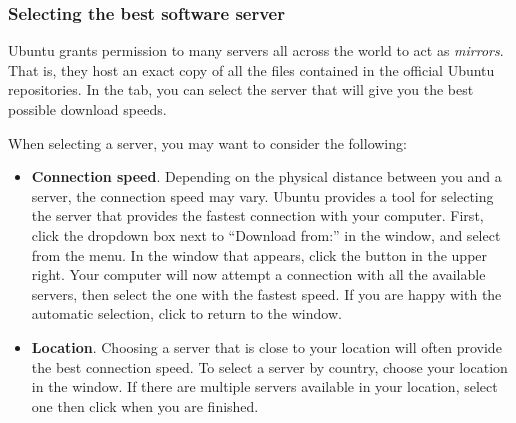 \subsubsection{Selecting the best software server}

Ubuntu grants permission to many servers all across the world to act as \emph{mirrors}. That is, they host an exact copy of all the files contained in the official Ubuntu repositories. In the  tab, you can select the server that will give you the best possible download speeds. 

When selecting a server, you may want to consider the following:

\begin{itemize}
	\item \textbf{Connection speed}. Depending on the physical distance between you and a server, the connection speed may vary. Ubuntu provides a tool for selecting the server that provides the fastest connection with your computer. 
		\subitem First, click the dropdown box next to ``Download from:'' in the  window, and select  from the menu. In the  window that appears, click the  button in the upper right. Your computer will now attempt a connection with all the available servers, then select the one with the fastest speed. If you are happy with the automatic selection, click  to return to the  window.
	\item \textbf{Location}. Choosing a server that is close to your location will often provide the best connection speed.
		\subitem To select a server by country, choose your location in the  window. If there are multiple servers available in your location, select one then click  when you are finished.
	\end{itemize}
\begin{comment}
This needs to be reworded - dropping for now. --jaminday
	\item \textbf{Security}. This should not concern you at all, as Canonical ensures the third party servers are trustworthy. However, if you still think you might be at risk with just any server, you could select one of the Ubuntu secure servers, such as the \textbf{Main server} or the \textbf{http://ubuntu.securedservers.com} server.

JasonCook599 - How is this:
This should not concern you much. Canonical ensures that the third party servers are trustworthy. All of the third party servers listed can be used, but if you don't trust a server you can use the default server.

\end{comment}

